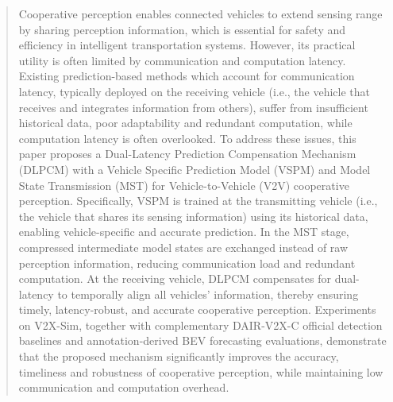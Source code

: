 \documentclass[lettersize,journal]{IEEEtran}
\begin{document}
\begin{abstract}
Cooperative perception enables connected vehicles to extend sensing range by sharing perception information, which is essential for safety and efficiency in intelligent transportation systems. However, its practical utility is often limited by communication and computation latency. Existing prediction-based methods which account for communication latency, typically deployed on the receiving vehicle (i.e., the vehicle that receives and integrates information from others), suffer from insufficient historical data, poor adaptability and redundant computation, while computation latency is often overlooked. To address these issues, this paper proposes a Dual-Latency Prediction Compensation Mechanism (DLPCM) with a Vehicle Specific Prediction Model (VSPM) and Model State Transmission (MST) for Vehicle-to-Vehicle (V2V) cooperative perception. Specifically, VSPM is trained at the transmitting vehicle (i.e., the vehicle that shares its sensing information) using its historical data, enabling vehicle-specific and accurate prediction. In the MST stage, compressed intermediate model states are exchanged instead of raw perception information, reducing communication load and redundant computation. At the receiving vehicle, DLPCM compensates for dual-latency to temporally align all vehicles’ information, thereby ensuring timely, latency-robust, and accurate cooperative perception. Experiments on V2X-Sim, together with complementary DAIR-V2X-C official detection baselines and annotation-derived BEV forecasting evaluations, demonstrate that the proposed mechanism significantly improves the accuracy, timeliness and robustness of cooperative perception, while maintaining low communication and computation overhead.











\end{abstract}
\end{document}
